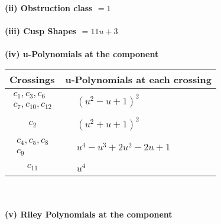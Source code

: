 \documentclass[1p]{elsarticle_modified}
\theoremstyle{definition}
\begin{document}
\flushleft \textbf{(ii) Obstruction class $= 1$}\\~\\
\flushleft \textbf{(iii) Cusp Shapes $= 11 u+3$}\\~\\
\newpage\renewcommand{\arraystretch}{1}
\flushleft \textbf{(iv) u-Polynomials at the component}\newline \\
\begin{tabular}{m{50pt}|m{274pt}}
Crossings & \hspace{64pt}u-Polynomials at each crossing \\
\hline $$\begin{aligned}c_{1},c_{3},c_{6}\\c_{7},c_{10},c_{12}\end{aligned}$$&$\begin{aligned}
&(u^2- u+1)^2
\end{aligned}$\\
\hline $$\begin{aligned}c_{2}\end{aligned}$$&$\begin{aligned}
&(u^2+u+1)^2
\end{aligned}$\\
\hline $$\begin{aligned}c_{4},c_{5},c_{8}\\c_{9}\end{aligned}$$&$\begin{aligned}
&u^4- u^3+2 u^2-2 u+1
\end{aligned}$\\
\hline $$\begin{aligned}c_{11}\end{aligned}$$&$\begin{aligned}
&u^4
\end{aligned}$\\
\hline
\end{tabular}\\~\\
\newpage\renewcommand{\arraystretch}{1}
\flushleft \textbf{(v) Riley Polynomials at the component}\newline \\
\end{document}
